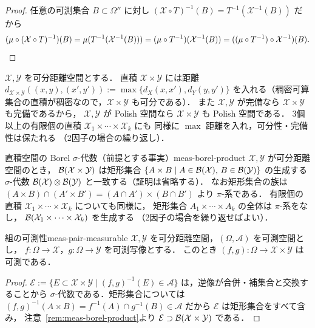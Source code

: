 \begin{proof}
  任意の可測集合 $B\subset\Omega''$ に対し
  $(\mathcal{X}\circ T)^{-1}(B)=T^{-1}(\mathcal{X}^{-1}(B))$ だから
  \[
    (\mu\circ(\mathcal{X}\circ T)^{-1})(B)
    =\mu(T^{-1}(\mathcal{X}^{-1}(B)))
    =(\mu\circ T^{-1})(\mathcal{X}^{-1}(B))
    =((\mu\circ T^{-1})\circ \mathcal{X}^{-1})(B).  \qedhere
  \]
\end{proof}

$\mathcal{X},\mathcal{Y}$ を可分距離空間とする．
直積 $\mathcal{X}\times \mathcal{Y}$ には距離
$d_{\mathcal{X}\times \mathcal{Y}}((x,y),(x',y')):=\max\{d_X(x,x'),d_Y(y,y')\}$
を入れる（稠密可算集合の直積が稠密なので，$\mathcal{X}\times \mathcal{Y}$ も可分である）．
また $\mathcal{X},\mathcal{Y}$ が完備なら $\mathcal{X}\times \mathcal{Y}$ も完備であるから，
$\mathcal{X},\mathcal{Y}$ が Polish 空間なら $\mathcal{X}\times \mathcal{Y}$ も Polish 空間である．
3個以上の有限個の直積 $\mathcal{X}_1\times\cdots\times\mathcal{X}_k$ にも
同様に $\max$ 距離を入れ，可分性・完備性は保たれる
（2因子の場合の繰り返し）．

\begin{remark}{直積空間の Borel $\sigma$-代数（前提とする事実）}{meas-borel-product}
  $\mathcal{X},\mathcal{Y}$ が可分距離空間のとき，
  $\mathcal{B}(\mathcal{X}\times \mathcal{Y})$ は矩形集合
  $\{A\times B\mid A\in\mathcal{B}(\mathcal{X}),\,B\in\mathcal{B}(\mathcal{Y})\}$
  の生成する $\sigma$-代数
  $\mathcal{B}(\mathcal{X})\otimes\mathcal{B}(\mathcal{Y})$ と一致する（証明は省略する）．
  なお矩形集合の族は
  $(A\times B)\cap(A'\times B')=(A\cap A')\times(B\cap B')$
  より $\pi$-系である．
  有限個の直積 $\mathcal{X}_1\times\cdots\times\mathcal{X}_k$ についても同様に，
  矩形集合 $A_1\times\cdots\times A_k$ の全体は $\pi$-系をなし，
  $\mathcal{B}(\mathcal{X}_1\times\cdots\times\mathcal{X}_k)$ を生成する
  （2因子の場合を繰り返せばよい）．
\end{remark}

\begin{claim}{組の可測性}{meas-pair-measurable}
  $\mathcal{X},\mathcal{Y}$ を可分距離空間，$(\Omega,\mathcal{A})$ を可測空間とし，
  $f\colon\Omega\to\mathcal{X}$，$g\colon\Omega\to\mathcal{Y}$ を可測写像とする．
  このとき $(f,g)\colon\Omega\to\mathcal{X}\times\mathcal{Y}$ は可測である．
\end{claim}

\begin{proof}
  $\mathcal{E}:=\{E\subset\mathcal{X}\times\mathcal{Y}\mid
  (f,g)^{-1}(E)\in\mathcal{A}\}$ は，逆像が合併・補集合と交換することから
  $\sigma$-代数である．矩形集合については
  $(f,g)^{-1}(A\times B)=f^{-1}(A)\cap g^{-1}(B)\in\mathcal{A}$ だから
  $\mathcal{E}$ は矩形集合をすべて含み，
  注意~\ref{rem:meas-borel-product}より
  $\mathcal{E}\supset\mathcal{B}(\mathcal{X}\times\mathcal{Y})$ である．
\end{proof}

